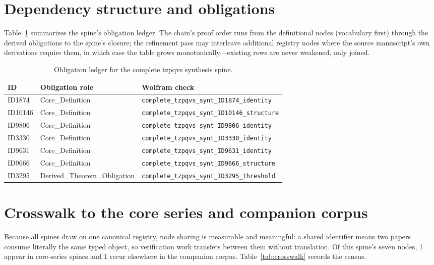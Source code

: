 \documentclass[11pt]{article}
\theoremstyle{remark}
\begin{document}
\section{Dependency structure and obligations}
\label{sec:dep}

Table~\ref{tab:obligations} summarizes the spine's obligation ledger. The chain's proof order runs from the definitional nodes (vocabulary first) through the derived obligations to the spine's closure; the refinement pass may interleave additional registry nodes where the source manuscript's own derivations require them, in which case the table grows monotonically---existing rows are never weakened, only joined.

\begin{table}[ht]
\centering
\small
\caption{Obligation ledger for the complete tzpqvs synthesis spine.}
\label{tab:obligations}
\begin{tabular}{llp{6.2cm}}
\toprule
ID & Obligation role & Wolfram check \\
\midrule
ID1874 & Core\_Definition & \texttt{complete\_tzpqvs\_synt\_ID1874\_identity} \\
ID10146 & Core\_Definition & \texttt{complete\_tzpqvs\_synt\_ID10146\_structure} \\
ID9806 & Core\_Definition & \texttt{complete\_tzpqvs\_synt\_ID9806\_identity} \\
ID3330 & Core\_Definition & \texttt{complete\_tzpqvs\_synt\_ID3330\_identity} \\
ID9631 & Core\_Definition & \texttt{complete\_tzpqvs\_synt\_ID9631\_identity} \\
ID9666 & Core\_Definition & \texttt{complete\_tzpqvs\_synt\_ID9666\_structure} \\
ID3295 & Derived\_Theorem\_Obligation & \texttt{complete\_tzpqvs\_synt\_ID3295\_threshold} \\
\bottomrule
\end{tabular}
\end{table}

\section{Crosswalk to the core series and companion corpus}
\label{sec:crosswalk}

Because all spines draw on one canonical registry, node sharing is measurable and meaningful: a shared identifier means two papers consume literally the same typed object, so verification work transfers between them without translation. Of this spine's seven nodes, 1 appear in core-series spines and 1 recur elsewhere in the companion corpus. Table~\ref{tab:crosswalk} records the census.
\end{document}
